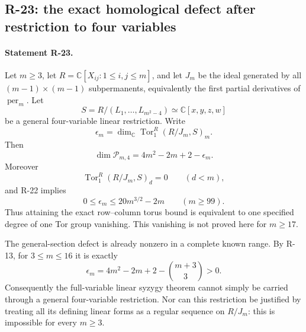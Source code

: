 \subsection{R-23: the exact homological defect after restriction to four variables}

\paragraph{Statement R-23.}
Let $m\geq3$, let $R=\mathbb C[X_{ij}:1\leq i,j\leq m]$, and let
$J_m$ be the ideal generated by all $(m-1)\times(m-1)$
subpermanents, equivalently the first partial derivatives of
$\operatorname{per}_m$. Let
\[
 S=R/(L_1,\ldots,L_{m^2-4})\simeq\mathbb C[x,y,z,w]
\]
be a general four-variable linear restriction. Write
\[
 \epsilon_m=\dim_{\mathbb C}
       \operatorname{Tor}_1^R(R/J_m,S)_m.
\]
Then
\begin{equation}\label{R23:Tor_defect}
 \dim\mathcal P_{m,4}=4m^2-2m+2-\epsilon_m.
\end{equation}
Moreover
\begin{equation}\label{R23:first_degree}
 \operatorname{Tor}_1^R(R/J_m,S)_d=0\qquad(d<m),
\end{equation}
and R-22 implies
\[
 0\leq\epsilon_m\leq20m^{3/2}-2m\qquad(m\geq99).
\]
Thus attaining the exact row--column torus bound is equivalent to one
specified degree of one Tor group vanishing. This vanishing is not
proved here for $m\geq17$.

The general-section defect is already nonzero in a complete known
range. By R-13, for $3\leq m\leq16$ it is exactly
\begin{equation}\label{R23:small_defect}
 \epsilon_m=4m^2-2m+2-\binom{m+3}{3}>0.
\end{equation}
Consequently the full-variable linear syzygy theorem cannot simply be
carried through a general four-variable restriction. Nor can this
restriction be justified by treating all its defining linear forms as
a regular sequence on $R/J_m$: this is impossible for every $m\geq3$.

